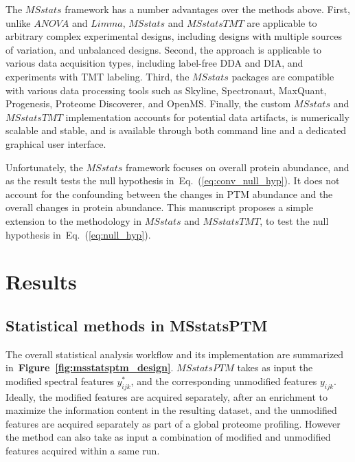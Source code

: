\documentclass[mcp]{article}
\numberwithin{table}{section}
\def\eqref#1{Eq.~(\ref{eq:#1})}
\def\figref#1{{\bf Figure~\ref{fig:#1}}}
\begin{document}
The $MSstats$ framework has a number advantages over the methods above. 
First, unlike $ANOVA$ and $Limma$, $MSstats$ and $MSstatsTMT$ are applicable to arbitrary complex experimental designs, including designs with multiple sources of variation, and unbalanced designs. 
Second, the approach is applicable to various data acquisition types, including label-free DDA and DIA, and experiments with TMT labeling. 
Third, the $MSstats$ packages are compatible with various data processing tools such as Skyline, Spectronaut, MaxQuant, Progenesis, Proteome Discoverer, and OpenMS. 
Finally, the custom $MSstats$ and $MSstatsTMT$ implementation accounts for potential data artifacts, is numerically scalable and stable, and is available through both command line and a dedicated graphical user interface.

Unfortunately, the $MSstats$ framework focuses on overall protein abundance, and as the result tests the null hypothesis in~\eqref{conv_null_hyp}. It does not account for the confounding between the changes in PTM abundance and the overall changes in protein abundance. This manuscript proposes a simple extension to the methodology in $MSstats$ and $MSstatsTMT$, to test the null hypothesis in~\eqref{null_hyp}.

\section{Results}

\subsection*{Statistical methods in MSstatsPTM}
\label{sec:adjustment_summary}

\medskip {}

\medskip \noindent
The overall statistical analysis workflow and its implementation are summarized in~\figref{msstatsptm_design}. $MSstatsPTM$ takes as input the modified spectral features $y_{ijk}^{\ast}$, and the corresponding unmodified features $y_{ijk}$. Ideally, the modified features are acquired separately, after an enrichment to maximize the information content in the resulting dataset, and the unmodified features are acquired separately as part of a global proteome profiling. However the method can also take as input a combination of modified and unmodified features acquired within a same run. 
\end{document}
